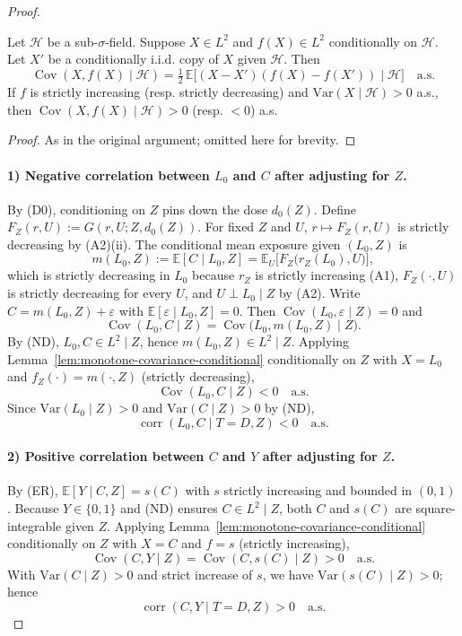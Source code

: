 \begin{proof}
\begin{lemma}\label{lem:monotone-covariance-conditional}
Let $\mathcal H$ be a sub-$\sigma$-field. Suppose $X \in L^2$ and $f(X) \in L^2$ conditionally on $\mathcal H$. Let $X'$ be a conditionally i.i.d. copy of $X$ given $\mathcal H$. Then
\[
\operatorname{Cov}(X, f(X) \mid \mathcal H) 
= \tfrac12\, \mathbb E\big[(X {-} X')(f(X) {-} f(X')) 
\mid \mathcal H\big] \quad \text{a.s.}
\]
If $f$ is strictly increasing (resp. strictly decreasing) and $\mathrm{Var}(X \mid \mathcal H) > 0$ a.s., then $\operatorname{Cov}(X, f(X) \mid \mathcal H) > 0$ (resp. $< 0$) a.s.
\end{lemma}
\begin{proof}
As in the original argument; omitted here for brevity.\qedhere
\end{proof}

\paragraph{1) Negative correlation between $L_0$ and $C$ after adjusting for $Z$.}
By (D0), conditioning on $Z$ pins down the dose $d_0(Z)$. Define $F_Z(r, U) := G(r, U; Z, d_0(Z))$. For fixed $Z$ and $U$, $r \mapsto F_Z(r, U)$ is strictly decreasing by (A2)(ii). The conditional mean exposure given $(L_0, Z)$ is
\[
 m(L_0, Z) := \mathbb E[C \mid L_0, Z] 
 = \mathbb E_U\big[F_Z\big(r_Z(L_0), U\big)\big],
\]
which is strictly decreasing in $L_0$ because $r_Z$ is strictly increasing (A1), $F_Z(\cdot, U)$ is strictly decreasing for every $U$, and $U \perp L_0 \mid Z$ by (A2). Write $C = m(L_0, Z) + \varepsilon$ with $\mathbb E[\varepsilon \mid L_0, Z] = 0$. Then $\operatorname{Cov}(L_0, \varepsilon \mid Z) = 0$ and
\[
\operatorname{Cov}(L_0, C \mid Z) = \operatorname{Cov}\big(L_0, m(L_0, Z) \mid Z\big).
\]
By (ND), $L_0, C \in L^2 \mid Z$, hence $m(L_0, Z) \in L^2 \mid Z$. Applying Lemma~\ref{lem:monotone-covariance-conditional} conditionally on $Z$ with $X = L_0$ and $f_Z(\cdot) = m(\cdot, Z)$ (strictly decreasing),
\[
\operatorname{Cov}(L_0, C \mid Z) < 0 \quad \text{a.s.}
\]
Since $\mathrm{Var}(L_0 \mid Z) > 0$ and $\mathrm{Var}(C \mid Z) > 0$ by (ND),
\[
\operatorname{corr}(L_0, C \mid T{=}D, Z) < 0 \quad \text{a.s.}
\]

\paragraph{2) Positive correlation between $C$ and $Y$ after adjusting for $Z$.}
By (ER), $\mathbb E[Y \mid C, Z] = s(C)$ with $s$ strictly increasing and bounded in $(0,1)$. Because $Y \in \{0,1\}$ and (ND) ensures $C \in L^2 \mid Z$, both $C$ and $s(C)$ are square-integrable given $Z$. Applying Lemma~\ref{lem:monotone-covariance-conditional} conditionally on $Z$ with $X = C$ and $f = s$ (strictly increasing),
\[
\operatorname{Cov}(C, Y \mid Z) = \operatorname{Cov}(C, s(C) \mid Z) > 0 \quad \text{a.s.}
\]
With $\mathrm{Var}(C \mid Z) > 0$ and strict increase of $s$, we have $\mathrm{Var}(s(C) \mid Z) > 0$; hence
\[
\operatorname{corr}(C, Y \mid T{=}D, Z) > 0 \quad \text{a.s.}
\]


\end{proof}
